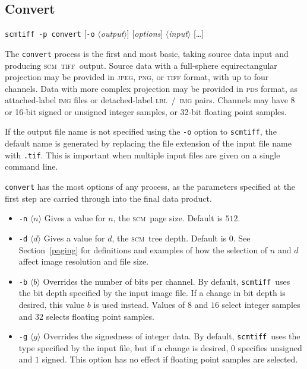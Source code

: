 \documentclass[oneside,10pt]{memoir}
\newcommand{\scm}     {\textsc{scm}}
\newcommand{\tiff}    {\textsc{tiff}}
\newcommand{\scmtiff} {\texttt{scmtiff}}
\newcommand{\inangles}[1]{$\langle$#1$\rangle$}
\newenvironment{optionlist}
  {\setlength{\leftmargini}{1in}\begin{itemize}}{\end{itemize}}
\begin{document}
\begin{Spacing}{1.1}
\subsection{Convert}

\noindent\scmtiff\ \texttt{-p convert} [\texttt{-o} \inangles{\textit{output}}] [\textit{options}] \inangles{\textit{input}} [\ldots]

\bigskip The \texttt{convert} process is the first and most basic, taking source data input and producing \scm\ \tiff\ output. Source data with a full-sphere equirectangular projection may be provided in \textsc{jpeg}, \textsc{png}, or \textsc{tiff} format, with up to four channels. Data with more complex projection may be provided in \textsc{pds} format, as attached-label \textsc{img} files or detached-label \textsc{lbl}~/~\textsc{img} pairs. Channels may have 8 or 16-bit signed or unsigned integer samples, or 32-bit floating point samples.

If the output file name is not specified using the \texttt{-o} option to \scmtiff, the default name is generated by replacing the file extension of the input file name with \texttt{.tif}. This is important when multiple input files are given on a single command line.

\texttt{convert} has the most options of any process, as the parameters specified at the first step are carried through into the final data product.

\begin{optionlist}
\item[\texttt{-n} \inangles{$n$}] Gives a value for $n$, the \scm\ page size. Default is $512$.

\item[\texttt{-d} \inangles{$d$}] Gives a value for $d$, the \scm\ tree depth. Default is $0$. See Section~\ref{paging} for definitions and examples of how the selection of $n$ and $d$ affect image resolution and file size.

\item[\texttt{-b} \inangles{$b$}] Overrides the number of bits per channel. By default, \scmtiff\ uses the bit depth specified by the input image file. If a change in bit depth is desired, this value $b$ is used instead. Values of $8$ and $16$ select integer samples and $32$ selects floating point samples.

\item[\texttt{-g} \inangles{$g$}] Overrides the signedness of integer data. By default, \scmtiff\ uses the type specified by the input file, but if a change is desired, $0$ specifies unsigned and $1$ signed. This option has no effect if floating point samples are selected.


\end{optionlist}
\end{Spacing}
\end{document}
